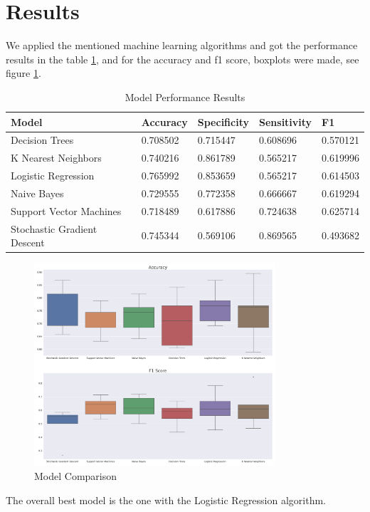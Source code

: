 \documentclass[11pt]{article}
\renewcommand{\arraystretch}{1.3}
\begin{document}
	\section{Results}
	We applied the mentioned machine learning algorithms and got the performance results in the table \ref{fig:results}, and for the accuracy and f1 score, boxplots were made, see figure \ref{fig:modelComparision}.

	\begin{table}[H]
		\renewcommand{\arraystretch}{1.3}
		\begin{tabularx}{\linewidth}{lXXXX}
			Model & Accuracy & Specificity & Sensitivity & F1 \\
			\toprule
			Decision Trees  &  0.708502  &  0.715447  &  0.608696  &  0.570121  \\
			K Nearest Neighbors  &  0.740216  &  0.861789  &  0.565217  &  0.619996  \\
			Logistic Regression  &  0.765992  &  0.853659  &  0.565217  &  0.614503  \\
			Naive Bayes  &  0.729555  &  0.772358  &  0.666667  &  0.619294  \\
			Support Vector Machines  &  0.718489  &  0.617886  &  0.724638  &  0.625714  \\
			Stochastic Gradient Descent  &  0.745344  &  0.569106  &  0.869565  &  0.493682  \\
		\end{tabularx}
		\caption{Model Performance Results}
		\label{fig:results}
	\end{table}
	\begin{figure}[H]
		\centering
		\includegraphics[width=0.8\textwidth]{img/model_comparision.pdf}
		\caption{Model Comparison}	
		\label{fig:modelComparision}
	\end{figure}
	The overall best model is the one with the Logistic Regression algorithm.
\end{document}
